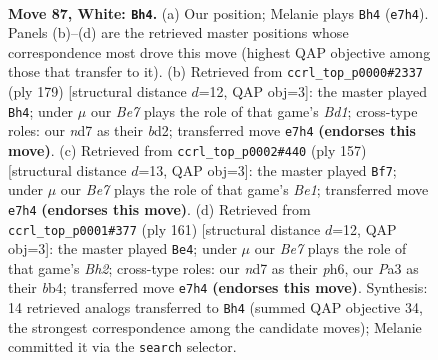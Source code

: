 \documentclass[11pt]{article}
\begin{document}
\clearpage

\begin{figure}[p]\centering
\begin{subfigure}{0.46\textwidth}\centering
\resizebox{\linewidth}{!}{%
\newchessgame
\chessboard[
  setfen={7k/3nB3/8/8/p4P2/P6P/6K1/8 w - - 0 87},
  showmover=false,
  pgfstyle=straightmove, color=movearrow, markmove={e7-h4}
]}
\caption{}
\end{subfigure}\hfill
\begin{subfigure}{0.46\textwidth}\centering
\resizebox{\linewidth}{!}{%
\newchessgame
\chessboard[
  setfen={3b4/8/3k4/1K2p2p/4P3/7P/3B4/8 b - - 7 90},
  showmover=false,
  pgfstyle=straightmove, color=movearrow, markmove={d8-h4}
]}
\caption{}
\end{subfigure}
\\[4pt]
\begin{subfigure}{0.46\textwidth}\centering
\resizebox{\linewidth}{!}{%
\newchessgame
\chessboard[
  setfen={4b2k/6pp/8/6P1/1N3K2/8/8/8 b - - 36 79},
  showmover=false,
  pgfstyle=straightmove, color=movearrow, markmove={e8-f7}
]}
\caption{}
\end{subfigure}\hfill
\begin{subfigure}{0.46\textwidth}\centering
\resizebox{\linewidth}{!}{%
\newchessgame
\chessboard[
  setfen={8/7b/7P/8/1Bp5/4k1K1/4p3/8 b - - 15 81},
  showmover=false,
  pgfstyle=straightmove, color=movearrow, markmove={h7-e4}
]}
\caption{}
\end{subfigure}
\caption{\textbf{Move 87, White: \texttt{Bh4}.} (a) Our position; Melanie plays \texttt{Bh4} (\texttt{e7h4}). Panels (b)--(d) are the retrieved master positions whose correspondence most drove this move (highest QAP objective among those that transfer to it). (b) Retrieved from \texttt{ccrl\_top\_p0000\#2337} (ply 179) [structural distance $d$=12, QAP obj=3]: the master played \texttt{Bh4}; under $\mu$ our \emph{Be7} plays the role of that game's \emph{Bd1}; cross-type roles: our \emph{n}d7 as their \emph{b}d2; transferred move \texttt{e7h4} \textbf{(endorses this move)}. (c) Retrieved from \texttt{ccrl\_top\_p0002\#440} (ply 157) [structural distance $d$=13, QAP obj=3]: the master played \texttt{Bf7}; under $\mu$ our \emph{Be7} plays the role of that game's \emph{Be1}; transferred move \texttt{e7h4} \textbf{(endorses this move)}. (d) Retrieved from \texttt{ccrl\_top\_p0001\#377} (ply 161) [structural distance $d$=12, QAP obj=3]: the master played \texttt{Be4}; under $\mu$ our \emph{Be7} plays the role of that game's \emph{Bh2}; cross-type roles: our \emph{n}d7 as their \emph{p}h6, our \emph{P}a3 as their \emph{b}b4; transferred move \texttt{e7h4} \textbf{(endorses this move)}. Synthesis: 14 retrieved analogs transferred to \texttt{Bh4} (summed QAP objective 34, the strongest correspondence among the candidate moves); Melanie committed it via the \texttt{search} selector.}
\label{fig:thought-m172}
\end{figure}
\end{document}
